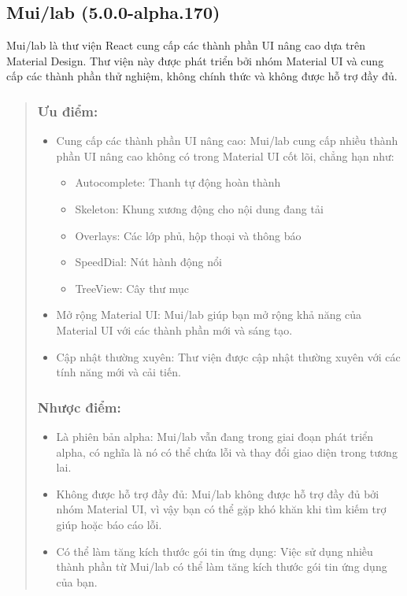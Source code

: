 \subsection{Mui/lab (5.0.0-alpha.170)}

Mui/lab là thư viện React cung cấp các thành phần UI nâng cao dựa trên Material Design. Thư viện này được phát triển bởi nhóm Material UI và cung cấp các thành phần thử nghiệm, không chính thức và không được hỗ trợ đầy đủ.


\begin{quote}
\subsubsection{Ưu điểm:}
\begin{itemize}
    \item Cung cấp các thành phần UI nâng cao: Mui/lab cung cấp nhiều thành phần UI nâng cao không có trong Material UI cốt lõi, chẳng hạn như:
    \begin{itemize}
    \item Autocomplete: Thanh tự động hoàn thành
    \item Skeleton: Khung xương động cho nội dung đang tải
    \item Overlays: Các lớp phủ, hộp thoại và thông báo
    \item SpeedDial: Nút hành động nổi
    \item TreeView: Cây thư mục
    \end{itemize}
    \item Mở rộng Material UI: Mui/lab giúp bạn mở rộng khả năng của Material UI với các thành phần mới và sáng tạo.
    \item Cập nhật thường xuyên: Thư viện được cập nhật thường xuyên với các tính năng mới và cải tiến.
     
\end{itemize}

\subsubsection{Nhược điểm:}
\begin{itemize}
    \item Là phiên bản alpha: Mui/lab vẫn đang trong giai đoạn phát triển alpha, có nghĩa là nó có thể chứa lỗi và thay đổi giao diện trong tương lai.
    \item Không được hỗ trợ đầy đủ: Mui/lab không được hỗ trợ đầy đủ bởi nhóm Material UI, vì vậy bạn có thể gặp khó khăn khi tìm kiếm trợ giúp hoặc báo cáo lỗi.
    \item Có thể làm tăng kích thước gói tin ứng dụng: Việc sử dụng nhiều thành phần từ Mui/lab có thể làm tăng kích thước gói tin ứng dụng của bạn.
\end{itemize}


\end{quote}
